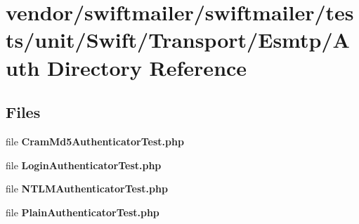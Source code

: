 \section{vendor/swiftmailer/swiftmailer/tests/unit/\+Swift/\+Transport/\+Esmtp/\+Auth Directory Reference}
\label{dir_e893223c5806968c0016987c07ee8a93}
\subsection*{Files}
\begin{DoxyCompactItemize}
\item 
file {\bf Cram\+Md5\+Authenticator\+Test.\+php}
\item 
file {\bf Login\+Authenticator\+Test.\+php}
\item 
file {\bf N\+T\+L\+M\+Authenticator\+Test.\+php}
\item 
file {\bf Plain\+Authenticator\+Test.\+php}
\end{DoxyCompactItemize}
